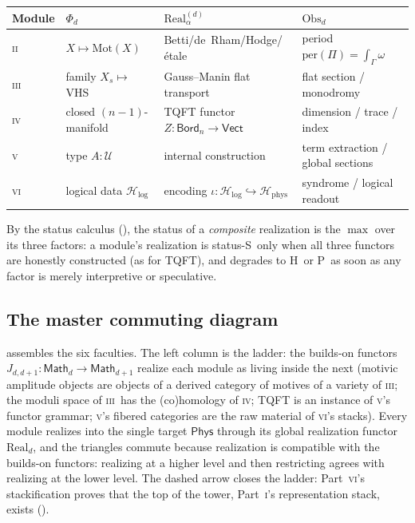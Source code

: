 \documentclass[12pt]{article}
\theoremstyle{definition}
\theoremstyle{remark}
\newcommand{\Math}{\mathsf{Math}}
\newcommand{\Phys}{\mathsf{Phys}}
\newcommand{\Vect}{\mathsf{Vect}}
\newcommand{\Bord}{\mathsf{Bord}}
\newcommand{\Real}{\mathrm{Real}}
\newcommand{\Obs}{\mathrm{Obs}}
\newcommand{\per}{\mathrm{per}}
\newcommand{\Sstat}{\textsf{S}}
\newcommand{\Hstat}{\textsf{H}}
\newcommand{\Pstat}{\textsf{P}}
\newcommand{\Ho}{\mathcal{H}}
\newcommand{\Hphys}{\Ho_{\mathrm{phys}}}
\newcommand{\Hlog}{\Ho_{\mathrm{log}}}
\newcommand{\Mot}{\mathrm{Mot}}
\newcommand{\PI}{\textsc{i}}
\newcommand{\PII}{\textsc{ii}}
\newcommand{\PIII}{\textsc{iii}}
\newcommand{\PIV}{\textsc{iv}}
\newcommand{\PV}{\textsc{v}}
\newcommand{\PVI}{\textsc{vi}}
\begin{document}
\begin{center}
\renewcommand{\arraystretch}{1.28}
\small
\begin{tabular}{@{}llll@{}}
\toprule
Module & $\Phi_d$ & $\Real^{(d)}_\alpha$ & $\Obs_d$ \\
\midrule
\PII\ & $X\mapsto\Mot(X)$ & Betti/de~Rham/Hodge/\'etale & period $\per(\Pi)=\int_\Gamma\omega$ \\
\PIII\ & family $X_s\mapsto$ VHS & Gauss--Manin flat transport & flat section / monodromy \\
\PIV\ & closed $(n{-}1)$-manifold & TQFT functor $Z:\Bord_n\to\Vect$ & dimension / trace / index \\
\PV\ & type $A:\mathcal U$ & internal construction & term extraction / global sections \\
\PVI\ & logical data $\Hlog$ & encoding $\iota:\Hlog\hookrightarrow\Hphys$ & syndrome / logical readout \\
\bottomrule
\end{tabular}
\end{center}

By the status calculus (), the status of a \emph{composite}
realization is the $\max$ over its three factors: a module's realization is
status-\Sstat\ only when all three functors are honestly constructed (as for TQFT), and
degrades to \Hstat\ or \Pstat\ as soon as any factor is merely interpretive or
speculative.

\subsection{The master commuting diagram}

 assembles the six faculties.  The left column is the ladder: the
builds-on functors $J_{d,d+1}:\Math_d\to\Math_{d+1}$ realize each module as living
inside the next (motivic amplitude objects are objects of a derived category of motives
of a variety of \PIII; the moduli space of \PIII\ has the (co)homology of \PIV;
TQFT is an instance of \PV's functor grammar; \PV's fibered categories are the raw
material of \PVI's stacks).  Every module realizes into the single target $\Phys$
through its global realization functor $\Real_d$, and the triangles commute because
realization is compatible with the builds-on functors: realizing at a higher level and
then restricting agrees with realizing at the lower level.  The dashed arrow closes the
ladder: Part~\PVI's stackification proves that the top of the tower, Part~\PI's
representation stack, exists ().
\end{document}
